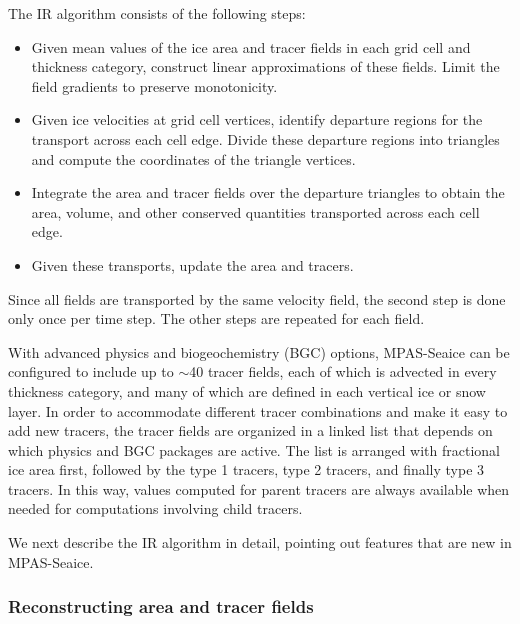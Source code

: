The IR algorithm consists of the following steps:
\begin{itemize}
\item Given mean values of the ice area and tracer fields in each grid cell and thickness category, construct linear approximations of these fields. Limit the field gradients to preserve monotonicity.
\item Given ice velocities at grid cell vertices, identify departure regions for the transport across each cell edge. Divide these departure regions into triangles and compute the coordinates of the triangle vertices.
\item Integrate the area and tracer fields over the departure triangles to obtain the area, volume, and other conserved quantities transported across each cell edge.
\item Given these transports, update the area and tracers.
\end{itemize}
\noindent
Since all fields are transported by the same velocity field, the second step is done only once per time step. The other steps are repeated for each field.

With advanced physics and biogeochemistry (BGC) options, MPAS-Seaice can be configured to include up to $\sim$40 tracer fields, each of which is advected in every thickness category, and many of which are defined in each vertical ice or snow layer. In order to accommodate different tracer combinations and make it easy to add new tracers, the tracer fields are organized in a linked list that depends on which physics and BGC packages are active. The list is arranged with fractional ice area first, followed by the type 1 tracers, type 2 tracers, and finally type 3 tracers. In this way, values computed for parent tracers are always available when needed for computations involving child tracers.

We next describe the IR algorithm in detail, pointing out features that are new in MPAS-Seaice.

\subsubsection{Reconstructing area and tracer fields}
\label{IR_reconstruct}

